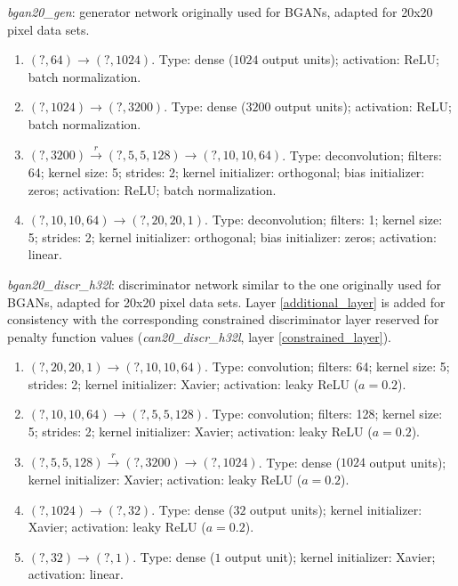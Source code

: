 \begin{description}
\item \textit{bgan20\_gen}: generator network originally used for BGANs, adapted for 20x20 pixel data sets.
\begin{enumerate}
    \item $(?, 64) \to (?, 1024)$. Type: dense ($1024$ output units); activation: ReLU; batch normalization. 
    \item $(?, 1024) \to (?, 3200)$. Type: dense ($3200$ output units); activation: ReLU; batch normalization.
    \item $(?, 3200) \stackrel{r}{\to} (?, 5, 5, 128) \to (?, 10, 10, 64)$. Type: deconvolution; filters: 64; kernel size: 5; strides: 2; kernel initializer: orthogonal; bias initializer: zeros; activation: ReLU; batch normalization.
    \item $(?, 10, 10, 64) \to (?, 20, 20, 1)$. Type: deconvolution; filters: 1; kernel size: 5; strides: 2; kernel initializer: orthogonal; bias initializer: zeros; activation: linear.
   \end{enumerate}
\item \textit{bgan20\_discr\_h32l}: discriminator network similar to the one originally used for BGANs, adapted for 20x20 pixel data sets. Layer \ref{additional_layer} is added for consistency with the corresponding constrained discriminator layer reserved for penalty function values (\textit{can20\_discr\_h32l}, layer \ref{constrained_layer}).
\begin{enumerate}
    \item $(?, 20, 20, 1) \to (?, 10, 10, 64)$. Type: convolution; filters: 64; kernel size: 5; strides: 2; kernel initializer: Xavier; activation: leaky ReLU ($a = 0.2$).
    \item $(?, 10, 10, 64) \to (?, 5, 5, 128)$. Type: convolution; filters: 128; kernel size: 5; strides: 2; kernel initializer: Xavier; activation: leaky ReLU ($a = 0.2$).
    \item $(?, 5, 5, 128) \stackrel{r}{\to} (?, 3200) \to (?, 1024)$. Type: dense ($1024$ output units); kernel initializer: Xavier; activation: leaky ReLU ($a = 0.2$).
    \item \label{additional_layer} $(?, 1024) \to (?, 32)$. Type: dense ($32$ output units); kernel initializer: Xavier; activation: leaky ReLU ($a = 0.2$).
    \item $(?, 32) \to (?, 1)$. Type: dense ($1$ output unit); kernel initializer: Xavier; activation: linear.
\end{enumerate}


\end{description}
